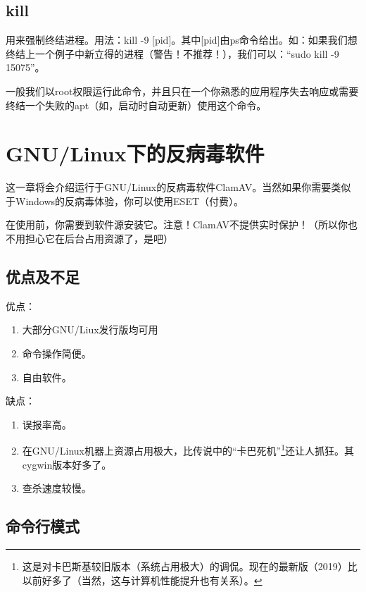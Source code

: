 \documentclass{book}
\begin{document}
\subsection{kill}
用来强制终结进程。用法：kill -9 [pid]。其中[pid]由ps命令给出。如：如果我们想终结上一个例子中新立得的进程（警告！不推荐！），我们可以：“sudo kill -9 15075”。\par
一般我们以root权限运行此命令，并且只在一个你熟悉的应用程序失去响应或需要终结一个失败的apt（如，启动时自动更新）使用这个命令。{\color{red}{不要终结你不熟悉的进程，它可能是系统进程！}}
\section{GNU/Linux下的反病毒软件}
\label{sec:avgl}这一章将会介绍运行于GNU/Linux的反病毒软件ClamAV。当然如果你需要类似于Windows的反病毒体验，你可以使用ESET（付费）。\par
在使用前，你需要到软件源安装它。注意！ClamAV不提供实时保护！（所以你也不用担心它在后台占用资源了，是吧）
\subsection{优点及不足}
优点：
\begin{enumerate}
	\item 大部分GNU/Liux发行版均可用
	\item 命令操作简便。
	\item 自由软件。
\end{enumerate}
缺点：
\begin{enumerate}
	\item 误报率高。
	\item 在GNU/Linux机器上资源占用极大，比传说中的“卡巴死机”\footnote{这是对卡巴斯基较旧版本（系统占用极大）的调侃。现在的最新版（2019）比以前好多了（当然，这与计算机性能提升也有关系）。}还让人抓狂。其cygwin版本好多了。
	\item 查杀速度较慢。
\end{enumerate}
\subsection{命令行模式}
\end{document}
